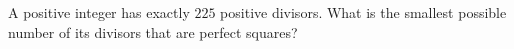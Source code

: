 A positive integer has exactly $225$ positive divisors. What is the smallest possible number of its divisors that are perfect squares?
